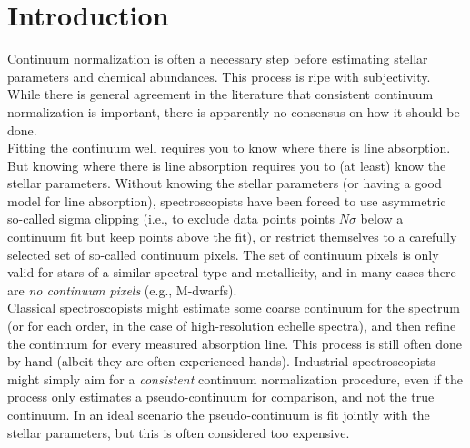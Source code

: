 \documentclass[modern]{aastex631}
\begin{document}

\section*{}\clearpage
\section{Introduction}\label{sec:intro}

Continuum normalization is often a necessary step before estimating stellar parameters and chemical abundances.
This process is ripe with subjectivity.
While there is general agreement in the literature that consistent continuum normalization is important, there is apparently no consensus on how it should be done.\\

Fitting the continuum well requires you to know where there is line absorption. But knowing where there is line absorption requires you to (at least) know the stellar parameters. Without knowing the stellar parameters (or having a good model for line absorption), spectroscopists have been forced to use asymmetric so-called sigma clipping (i.e., to exclude data points points $N\sigma$ below a continuum fit but keep points above the fit), or restrict themselves to a carefully selected set of so-called continuum pixels. The set of continuum pixels is only valid for stars of a similar spectral type and metallicity, and in many cases there are \emph{no continuum pixels} (e.g., M-dwarfs).\\

Classical spectroscopists might estimate some coarse continuum for the spectrum (or for each order, in the case of high-resolution echelle spectra), and then refine the continuum for every measured absorption line. This process is still often done by hand (albeit they are often experienced hands). Industrial spectroscopists might simply aim for a \emph{consistent} continuum normalization procedure, even if the process only estimates a pseudo-continuum for comparison, and not the true continuum. In an ideal scenario the pseudo-continuum is fit jointly with the stellar parameters, but this is often considered too expensive.\\
\end{document}
